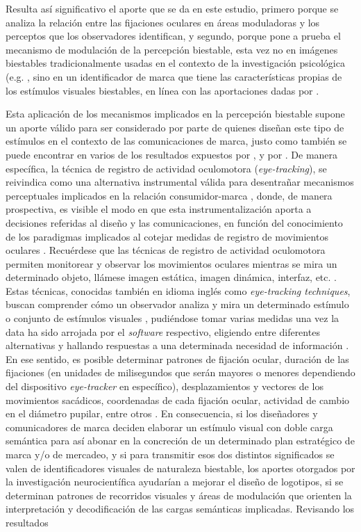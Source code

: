 \documentclass[spanish]{textolivre}
\begin{document}
Resulta así significativo el aporte que se da en este estudio, primero porque se analiza la relación entre las fijaciones oculares en áreas moduladoras y los perceptos que los observadores identifican, y segundo, porque pone a prueba el mecanismo de modulación de la percepción biestable, esta vez no en imágenes biestables tradicionalmente usadas en el contexto de la investigación psicológica (e.g. \textcite{rock_why_1994,kornmeier_ambiguous_2012,hsiao_assessing_2012}, sino en un identificador de marca que tiene las características propias de los estímulos visuales biestables, en línea con las aportaciones dadas por \textcite{rodriguez-martinez_can_2024}. 

Esta aplicación de los mecanismos implicados en la percepción biestable supone un aporte válido para ser considerado por parte de quienes diseñan este tipo de estímulos en el contexto de las comunicaciones de marca, justo como también se puede encontrar en varios de los resultados expuestos por \textcite{azmy_eye_2023}, y por \textcite{rodriguez-martinez_can_2024}. De manera específica, la técnica de registro de actividad oculomotora (\textit{eye-tracking}), se reivindica como una alternativa instrumental válida para desentrañar mecanismos perceptuales implicados en la relación consumidor-marca \cite{santos_eye_2015}, donde, de manera prospectiva, es visible el modo en que esta instrumentalización aporta a decisiones referidas al diseño y las comunicaciones, en función del conocimiento de los paradigmas implicados al cotejar medidas de registro de movimientos oculares \cite{rosa_what_2015}. Recuérdese que las técnicas de registro de actividad oculomotora permiten monitorear y observar los movimientos oculares mientras se mira un determinado objeto, llámese imagen estática, imagen dinámica, interfaz, etc. \cite{rosa_what_2015}. Estas técnicas, conocidas también en idioma inglés como \textit{eye-tracking techniques}, buscan comprender cómo un observador analiza y mira un determinado estímulo o conjunto de estímulos visuales \cite{fu_advances_2016}, pudiéndose tomar varias medidas una vez la data ha sido arrojada por el \textit{software} respectivo, eligiendo entre diferentes alternativas y hallando respuestas a una determinada necesidad de información \cite{carter_best_2020}. En ese sentido, es posible determinar patrones de fijación ocular, duración de las fijaciones (en unidades de milisegundos que serán mayores o menores dependiendo del dispositivo \textit{eye-tracker} en específico), desplazamientos y vectores de los movimientos sacádicos, coordenadas de cada fijación ocular, actividad de cambio en el diámetro pupilar, entre otros \cite{tien_eye_2014}. En consecuencia, si los diseñadores y comunicadores de marca deciden elaborar un estímulo visual con doble carga semántica para así abonar en la concreción de un determinado plan estratégico de marca y/o de mercadeo, y si para transmitir esos dos distintos significados se valen de identificadores visuales de naturaleza biestable, los aportes otorgados por la investigación neurocientífica ayudarían a mejorar el diseño de logotipos, si se determinan patrones de recorridos visuales y áreas de modulación que orienten la interpretación y decodificación de las cargas semánticas implicadas. Revisando los resultados 
\end{document}
